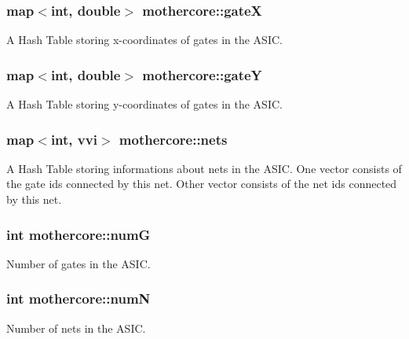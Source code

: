 \subsubsection[{gateX}]{\setlength{\rightskip}{0pt plus 5cm}map$<$int, double$>$ mothercore\+::gateX\hspace{0.3cm}{\ttfamily [private]}}\hypertarget{classmothercore_ac267207dbf960e3f837769edee99d024}{}\label{classmothercore_ac267207dbf960e3f837769edee99d024}
A Hash Table storing x-\/coordinates of gates in the A\+S\+IC. 
\subsubsection[{gateY}]{\setlength{\rightskip}{0pt plus 5cm}map$<$int, double$>$ mothercore\+::gateY\hspace{0.3cm}{\ttfamily [private]}}\hypertarget{classmothercore_a9d61c6914daf39e900b2f1c729be4ed3}{}\label{classmothercore_a9d61c6914daf39e900b2f1c729be4ed3}
A Hash Table storing y-\/coordinates of gates in the A\+S\+IC. 
\subsubsection[{nets}]{\setlength{\rightskip}{0pt plus 5cm}map$<$int, {\bf vvi}$>$ mothercore\+::nets\hspace{0.3cm}{\ttfamily [private]}}\hypertarget{classmothercore_a38b10c51ec32bf1583bcfcca022a378b}{}\label{classmothercore_a38b10c51ec32bf1583bcfcca022a378b}
A Hash Table storing informations about nets in the A\+S\+IC. One vector consists of the gate ids connected by this net. Other vector consists of the net ids connected by this net. 
\subsubsection[{numG}]{\setlength{\rightskip}{0pt plus 5cm}int mothercore\+::numG\hspace{0.3cm}{\ttfamily [private]}}\hypertarget{classmothercore_ae81a713046775c9beb1e865f54238d58}{}\label{classmothercore_ae81a713046775c9beb1e865f54238d58}
Number of gates in the A\+S\+IC. 
\subsubsection[{numN}]{\setlength{\rightskip}{0pt plus 5cm}int mothercore\+::numN\hspace{0.3cm}{\ttfamily [private]}}\hypertarget{classmothercore_a06dd4fcec53dffd503474103e59fd2ed}{}\label{classmothercore_a06dd4fcec53dffd503474103e59fd2ed}
Number of nets in the A\+S\+IC. 
